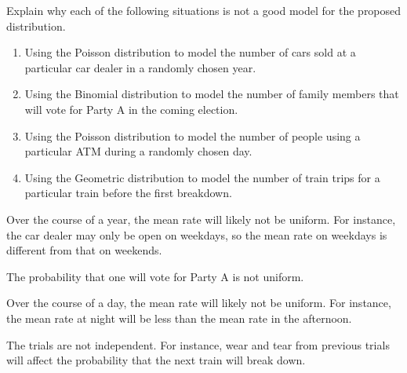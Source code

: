 \begin{problem}
    Explain why each of the following situations is not a good model for the proposed distribution.
    \begin{enumerate}
        \item Using the Poisson distribution to model the number of cars sold at a particular car dealer in a randomly chosen year.
        \item Using the Binomial distribution to model the number of family members that will vote for Party A in the coming election.
        \item Using the Poisson distribution to model the number of people using a particular ATM during a randomly chosen day.
        \item Using the Geometric distribution to model the number of train trips for a particular train before the first breakdown.
    \end{enumerate}
\end{problem}
\begin{solution}
    \begin{ppart}
        Over the course of a year, the mean rate will likely not be uniform. For instance, the car dealer may only be open on weekdays, so the mean rate on weekdays is different from that on weekends.
    \end{ppart}
    \begin{ppart}
        The probability that one will vote for Party A is not uniform.
    \end{ppart}
    \begin{ppart}
        Over the course of a day, the mean rate will likely not be uniform. For instance, the mean rate at night will be less than the mean rate in the afternoon.
    \end{ppart}
    \begin{ppart}
        The trials are not independent. For instance, wear and tear from previous trials will affect the probability that the next train will break down.
    \end{ppart}
\end{solution}

